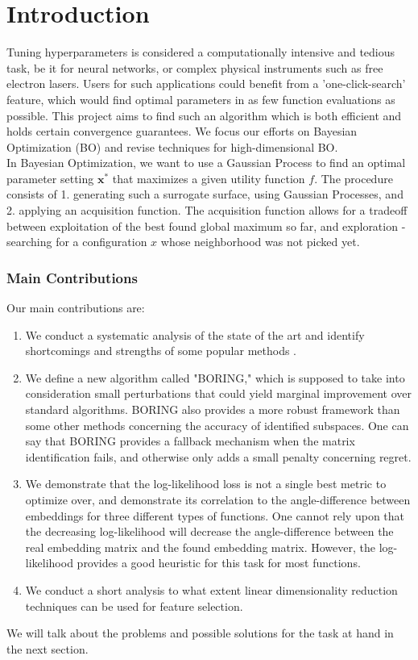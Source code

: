 \chapter{Introduction}

Tuning hyperparameters is considered a computationally intensive and tedious task, be it for neural networks, or complex physical instruments such as free electron lasers.
Users for such applications could benefit from a 'one-click-search' feature, which would find optimal parameters in as few function evaluations as possible.
This project aims to find such an algorithm which is both efficient and holds certain convergence guarantees.
We focus our efforts on Bayesian Optimization (BO) and revise techniques for high-dimensional BO. \\

In Bayesian Optimization, we want to use a Gaussian Process to find an optimal parameter setting $\mathbf{x^*}$ that maximizes a given utility function $f$.
The procedure consists of 1. generating such a surrogate surface, using Gaussian Processes, and 2. applying an acquisition function.
The acquisition function allows for a tradeoff between exploitation of the best found global maximum so far, and exploration - searching for a configuration $x$ whose neighborhood was not picked yet.\\

\subsection{Main Contributions}

Our main contributions are:

\begin{enumerate}
\item We conduct a systematic analysis of the state of the art and identify shortcomings and strengths of some popular methods   .
\item We define a new algorithm called "BORING," which is supposed to take into consideration small perturbations that could yield marginal improvement over standard algorithms.
BORING also provides a more robust framework than some other methods concerning the accuracy of identified subspaces.
One can say that BORING provides a fallback mechanism when the matrix identification fails, and otherwise only adds a small penalty concerning regret.
\item We demonstrate that the log-likelihood loss is not a single best metric to optimize over, and demonstrate its correlation to the angle-difference between embeddings for three different types of functions.
One cannot rely upon that the decreasing log-likelihood will decrease the angle-difference between the real embedding matrix and the found embedding matrix. However, the log-likelihood provides a good heuristic for this task for most functions.
\item We conduct a short analysis to what extent linear dimensionality reduction techniques can be used for feature selection.
\end{enumerate}

We will talk about the problems and possible solutions for the task at hand in the next section.
